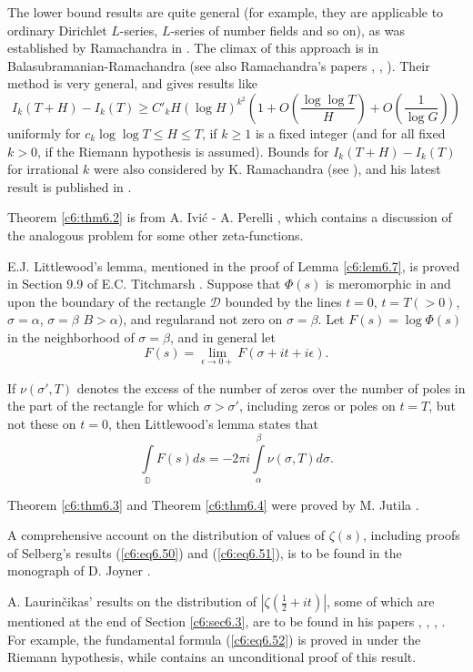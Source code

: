 The lower bound results are quite general (for example, they are
applicable to ordinary Dirichlet $L$-series, $L$-series of number
fields and so on), as was established by Ramachandra in \cite[Part
  III]{Ramachandra3}. The climax of this approach is in
Balasubramanian-Ramachandra 
\cite{Balasubramanian and Ramachandra5} (see also Ramachandra's papers
\cite{Ramachandra5}, \cite{Ramachandra7}, \cite{Ramachandra8}). Their
method is very general, and gives results like 
$$
I_k (T+H) - I_k(T) \geq C'_k H (\log H)^{k^2} \left( 1+ O \left(
\frac{\log \log T}{H} \right)  + O \left(\frac{1}{\log G} \right)
\right) 
$$
uniformly for $c_k \log \log T \leq H \leq T$, if $k \geq 1$ is a
fixed integer (and for all fixed $k>0$, if the Riemann hypothesis is
assumed). Bounds for $I_k(T+H) - I_k(T)$ for irrational $k$ were also
considered by K. Ramachandra (see \cite[Part II]{Ramachandra6}), 
and his latest result
is published in \cite[Part III]{Ramachandra6}. 

Theorem \ref{c6:thm6.2} is from A. Ivi\'c - A. Perelli \cite{Ivic and
  Perelli1}, which contains a discussion of the analogous problem for
some other zeta-functions. 

E.J. Littlewood's lemma, mentioned in the proof of Lemma
\ref{c6:lem6.7}, is proved in Section 9.9 of E.C. Titchmarsh
\cite{Titchmarsh1}. Suppose that $\Phi(s)$ is meromorphic in and upon
the boundary of the rectangle $\mathscr{D}$ bounded by the lines $t =
0$, $t = T(>0)$, $\sigma = \alpha$, $\sigma =\beta$ $B > \alpha)$, and
regular\pageoriginale and not zero on $\sigma =\beta$. Let $F(s) =
\log \Phi (s)$ in the neighborhood of $\sigma =\beta$, and in general
let 
$$
F(s) = \lim\limits_{\epsilon \to 0 +} F(\sigma + it + i \epsilon). 
$$

If $\nu(\sigma',T)$ denotes the excess of the number of zeros over the
number of poles in the part of the rectangle for which $\sigma >
\sigma'$, including zeros or poles on $t = T$, but not these on $t=0$,
then Littlewood's lemma states that 
$$ 
\int\limits_{\mathbb{D}} F(s) ds = - 2 \pi i
\int\limits^{\beta}_{\alpha} \nu(\sigma, T) d \sigma. 
$$

Theorem \ref{c6:thm6.3} and Theorem \ref{c6:thm6.4} were proved by
M. Jutila \cite{Jutila2}.  

A comprehensive account on the distribution of values of $\zeta(s)$,
including proofs of Selberg's results (\ref{c6:eq6.50}) and
(\ref{c6:eq6.51}), is to be found in the monograph of D. Joyner
\cite{Joyner1}. 

A. Laurin\v cikas' results on the distribution of $|\zeta(\frac{1}{2}
+ it)|$, some of which are mentioned at the end of Section
\ref{c6:sec6.3}, are to be found in his papers \cite{Laurincikas1},
\cite{Laurincikas2}, \cite{Laurincikas3}, \cite{Laurincikas4}. For
example, the fundamental formula (\ref{c6:eq6.52}) is proved in
\cite[Part I]{Laurincikas3} under the Riemann hypothesis, while
\cite[Part II]{Laurincikas3} contains an 
unconditional proof of this result. 

